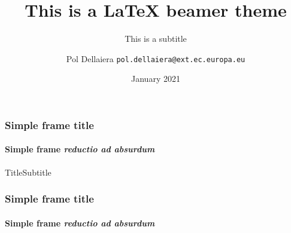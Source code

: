 \documentclass{beamer}
\title{This is a {\LaTeX} beamer theme}
\subtitle{This is a subtitle}
\date[2021]{January 2021}
\author[Pol]{Pol Dellaiera \texttt{pol.dellaiera@ext.ec.europa.eu}}
\begin{document}
\frame[plain]{\titlepage}

\begin{frame}[allowframebreaks]
    \frametitle{Simple frame title}
    \framesubtitle{Simple frame \textit{reductio ad absurdum}}
    \kant{}
\end{frame}

\begin{sepframe}{Title}{Subtitle}
\end{sepframe}

\begin{frame}[allowframebreaks]
    \frametitle{Simple frame title}
    \framesubtitle{Simple frame \textit{reductio ad absurdum}}
    \kant{}
\end{frame}
\end{document}
